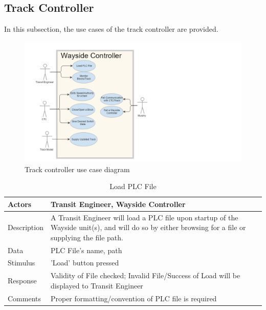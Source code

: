 \documentclass[]{article}
\begin{document}
\subsection{Track Controller}
In this subsection, the use cases of the track controller are provided.

\begin{figure}[H]
	\centering
	\includegraphics[scale=.3]{trackcontrollerusecase.png}
	\caption{Track controller use case diagram}
\end{figure}
\begin{table}[H]
	\centering
	\caption{Load PLC File}
	\begin{tabular}{|l|l|}
		\hline
		Actors & \parbox[t]{10cm}{Transit Engineer, Wayside Controller} \\ \hline
		Description & \parbox[t]{10cm}{A Transit Engineer will load a PLC file upon startup of the Wayside unit(s), and will do so by either browsing for a file or supplying the file path.} \\ \hline
		Data &  \parbox[t]{10cm}{PLC File's name, path} \\ \hline
		Stimulus &  \parbox[t]{10cm}{ 'Load' button pressed} \\ \hline
		Response & \parbox[t]{10cm}{Validity of File checked; Invalid File/Success of Load will be displayed to Transit Engineer}\\ \hline
		Comments & \parbox[t]{10cm}{Proper formatting/convention of PLC file is required	}  \\ \hline
	\end{tabular}
\end{table}
\end{document}
